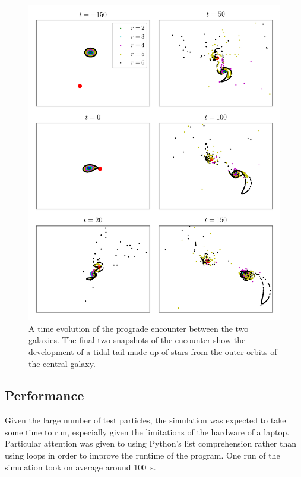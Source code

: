 \documentclass[twoside,twocolumn]{article}
\begin{document}
\begin{figure}
    \centering
    \includegraphics[width=\linewidth]{images/anticlockwise_positions.png}
    \caption{A time evolution of the prograde encounter between the two galaxies. The final two snapshots of the encounter show the development of a tidal tail made up of stars from the outer orbits of the central galaxy.}
    \label{figure:prograde}
\end{figure}    


    \subsection{Performance}

        Given the large number of test particles, the simulation was expected to take some time to run, especially given the limitations of the hardware of a laptop. Particular attention was given to using Python's list comprehension rather than using loops in order to improve the runtime of the program. One run of the simulation took on average around \SI{100}{\second}.
\end{document}
